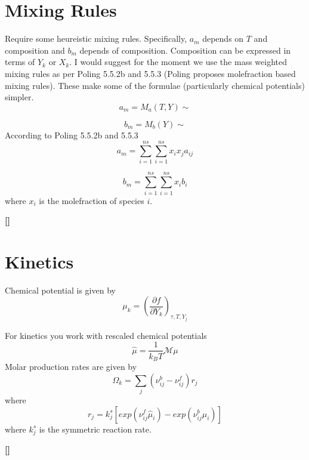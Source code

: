 \documentclass[11pt]{article}
\newcommand{\jbb}[1]{{\bf[{\color{red}{JBB:  #1}}]}}
\begin{document}
\section{Mixing Rules}
\label{sec:mix}


Require some heureistic mixing rules.
  Specifically, $a_m$ depends on $T$ and composition and $b_m$ depends of composition.  Composition
can be expressed in terms of $Y_k$ or $X_k$.  I would suggest for the moment we use the mass weighted
mixing rules as per Poling 5.5.2b and 5.5.3 (Poling proposes molefraction based mixing rules).  These make some of the formulae (particularly chemical
potentials) simpler.  
\begin{equation}
    a_m = M_a(T, Y) \sim 
\end{equation}

\begin{equation}
    b_m = M_b(Y) \sim 
\end{equation}
According to Poling 5.5.2b and 5.5.3
\begin{equation}
    a_m = \sum_{i=1}^{ns}  \sum_{i=1}^{ns} x_i x_j a_{ij}
\end{equation}

\begin{equation}
    b_m = \sum_{i=1}^{ns}  \sum_{i=1}^{ns} x_i b_i
\end{equation}
where $x_i$ is the molefraction of species $i$. 

\jbb{seems like we should be working in this form.

We will still need gradients wrt $Y_k$.  This is best done using 
\[
\nabla_Y a(X,T) = \nabla_X a(X,T) \frac{\partial X}{\partial Y} = \frac{\partial a}{\partial X}
(\mathcal{Y}- Y Y^T ) \mathcal{X}^{-1}
\]
}

\section{Kinetics}
\label{sec:kinetics}
Chemical potential is given by
\[
\label{eq:NIpotential}
\mu_k = \left( \frac{\partial f}{\partial Y_k}\right)_{\tau,T,Y_j}
\]

For kinetics you work with rescaled chemical potentials
\[
\hat{\mu} = \frac{1}{k_B T} \mathcal{M} \mu
\]
Molar production rates are given by
\[
\Omega_k = \sum_j (\nu_{ij}^b - \nu_{ij}^f) r_j
\]
where 
\[
r_j = k_j^s \left [ exp(\nu_{ij}^f \hat{\mu}_i) - exp ( \nu_{ij}^b \hat{\mu}_i) \right ] 
\]
where $k_j^s$ is the symmetric reaction rate.

\jbb{New Stuff}
\end{document}
